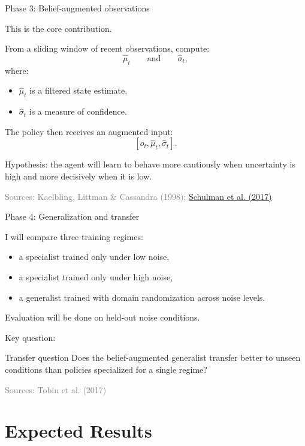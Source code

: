 \documentclass[11pt]{beamer}
\newcommand{\srcKaelbling}{Kaelbling, Littman \& Cassandra (1998)}
\newcommand{\srcSchulman}{\href{https://arxiv.org/abs/1707.06347}{Schulman et al. (2017)}}
\newcommand{\srcTobin}{Tobin et al. (2017)}
\newcommand{\SourceLine}[1]{\vfill{\tiny\textcolor{gray}{Sources: #1}}}
\begin{document}
\begin{frame}{Phase 3: Belief-augmented observations}

This is the core contribution.

\medskip
From a sliding window of recent observations, compute:
\[
\hat{\mu}_t \qquad \text{and} \qquad \hat{\sigma}_t,
\]
where:
\begin{itemize}
  \item $\hat{\mu}_t$ is a filtered state estimate,
  \item $\hat{\sigma}_t$ is a measure of confidence.
\end{itemize}

The policy then receives an augmented input:
\[
[o_t, \hat{\mu}_t, \hat{\sigma}_t].
\]

Hypothesis: the agent will learn to behave more cautiously when uncertainty is high and more decisively when it is low.

\SourceLine{\srcKaelbling; \srcSchulman}
\end{frame}


\begin{frame}{Phase 4: Generalization and transfer}

I will compare three training regimes:
\begin{itemize}
  \item a specialist trained only under low noise,
  \item a specialist trained only under high noise,
  \item a generalist trained with domain randomization across noise levels.
\end{itemize}

\medskip
Evaluation will be done on held-out noise conditions.

\medskip
Key question:
\begin{block}{Transfer question}
Does the belief-augmented generalist transfer better to unseen conditions than policies specialized for a single regime?
\end{block}

\SourceLine{\srcTobin}
\end{frame}


\section{Expected Results}
\end{document}
